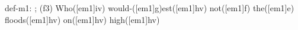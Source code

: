 def-m1: \grealign;
(f3) Who([em1]iv) would-([em1]g)est([em1]hv) not([em1]f) the([em1]e) floods([em1]hv) on([em1]hv) high([em1]hv)